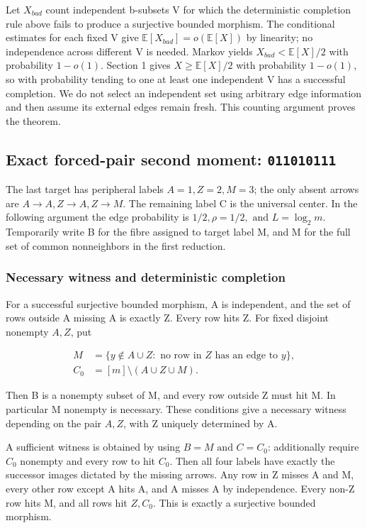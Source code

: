 \documentclass[11pt]{article}
\begin{document}
Let $X_{bad}$ count independent b-subsets V for which the deterministic completion rule above fails to produce a surjective bounded morphism. The conditional estimates for each fixed V give $\mathbb E[X_{bad}]=o(\mathbb E[X])$ by linearity; no independence across different V is needed. Markov yields $X_{bad}<\mathbb E[X]/2$ with probability $1-o(1)$. Section 1 gives $X\geq \mathbb E[X]/2$ with probability $1-o(1)$, so with probability tending to one at least one independent V has a successful completion. We do not select an independent set using arbitrary edge information and then assume its external edges remain fresh. This counting argument proves the theorem.

\subsection{Exact forced-pair second moment: \texttt{011010111}}

The last target has peripheral labels $A=1, Z=2, M=3$; the only absent arrows are $A\to A, Z\to A, Z\to M$. The remaining label C is the universal center. In the following argument the edge probability is $1/2, \rho =1/2, \text{ and } L=\log _{2} m$. Temporarily write B for the fibre assigned to target label M, and M for the full set of common nonneighbors in the first reduction.

\subsubsection{Necessary witness and deterministic completion}

For a successful surjective bounded morphism, A is independent, and the set of rows outside A missing A is exactly Z. Every row hits Z. For fixed disjoint nonempty $A,Z$, put

\[
\begin{aligned}
M&=\{y\notin A\cup Z:\text{ no row in }Z\text{ has an edge to }y\},\\
C_0&=[m]\setminus(A\cup Z\cup M).
\end{aligned}
\]

Then B is a nonempty subset of M, and every row outside Z must hit M. In particular M nonempty is necessary. These conditions give a necessary witness depending on the pair $A,Z$, with Z uniquely determined by A.

A sufficient witness is obtained by using $B=M \text{ and } C=C_{0}$: additionally require $C_{0}$ nonempty and every row to hit $C_{0}$. Then all four labels have exactly the successor images dictated by the missing arrows. Any row in Z misses A and M, every other row except A hits A, and A misses A by independence. Every non-Z row hits M, and all rows hit $Z,C_{0}$. This is exactly a surjective bounded morphism.
\end{document}
